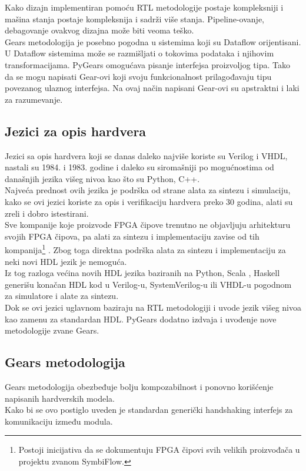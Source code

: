 Kako dizajn implementiran pomoću RTL metodologije postaje kompleksniji i mašina
stanja postaje kompleksnija i sadrži više stanja.
Pipeline-ovanje, debagovanje  ovakvog dizajna može biti veoma teško. \\
Gears metodologija je posebno pogodna u sistemima koji su Dataflow orijentisani.
U Dataflow sistemima može se razmišljati o tokovima podataka i njihovim
transformacijama.
PyGears omogućava pisanje interfejsa proizvoljog tipa.
Tako da se mogu napisati Gear-ovi koji svoju funkcionalnost prilagođavaju
tipu povezanog ulaznog interfejsa.
Na ovaj način napisani Gear-ovi su apstraktni i laki za razumevanje.

\subsection{Jezici za opis hardvera}

Jezici sa opis hardvera koji se danas daleko najviše koriste su Verilog i VHDL,
nastali su 1984. i 1983. godine i daleko su siromašniji po mogućnostima od današnjih
jezika višeg nivoa kao što su Python, C++. \\
Najveća prednost ovih jezika je podrška od strane alata za sintezu i simulaciju,
kako se ovi jezici koriste za opis i verifikaciju hardvera preko 30 godina,
alati su zreli i dobro istestirani. \\

Sve kompanije koje proizvode FPGA čipove trenutno ne objavljuju
arhitekturu svojih FPGA čipova, pa alati za sintezu i implementaciju zavise od
tih kompanija\footnote{Postoji inicijativa da se dokumentuju FPGA čipovi svih velikih
proizvođača u projektu zvanom SymbiFlow\cite{SymbiFlow}.}
.
Zbog toga direktna podrška alata za sintezu i implementaciju za neki novi HDL jezik je
nemoguća. \\

Iz tog razloga većina novih HDL jezika baziranih na
Python\cite{decaluwe2004myhdl, PyGears_OSDA}, Scala
\cite{bachrach2012chisel, SpinalHDL}, Haskell\cite{baaij2010c} generišu konačan
HDL kod u Verilog-u, SystemVerilog-u ili VHDL-u pogodnom za simulatore i alate
za sintezu. \\

Dok se ovi jezici uglavnom baziraju na RTL metodologiji i uvode jezik višeg
nivoa kao zamenu za standardan HDL.
PyGears dodatno izdvaja i uvođenje nove metodologije zvane Gears.

\subsection{Gears metodologija}
Gears metodologija obezbeđuje bolju kompozabilnost i ponovno korišćenje
napisanih hardverskih modela. \\
Kako bi se ovo postiglo uveden je standardan generički handshaking interfejs za
komunikaciju između modula.

